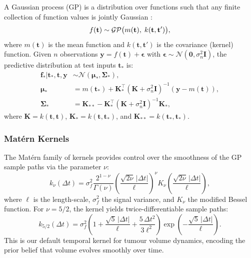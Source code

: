A Gaussian process (GP) is a distribution over functions such that any finite
collection of function values is jointly Gaussian
\cite{rasmussen2006gaussian}:
\begin{equation}
  f(\mathbf{t}) \sim \mathcal{GP}\bigl(m(\mathbf{t}),\; k(\mathbf{t}, \mathbf{t}')\bigr),
  \label{eq:gp_def}
\end{equation}
where $m(\mathbf{t})$ is the mean function and $k(\mathbf{t}, \mathbf{t}')$
is the covariance (kernel) function. Given $n$ observations
$\mathbf{y} = f(\mathbf{t}) + \boldsymbol{\epsilon}$ with
$\boldsymbol{\epsilon} \sim \mathcal{N}(\mathbf{0}, \sigma_n^2 \mathbf{I})$,
the predictive distribution at test inputs $\mathbf{t}_*$ is:
\begin{align}
  \mathbf{f}_* | \mathbf{t}_*, \mathbf{t}, \mathbf{y}
    &\sim \mathcal{N}(\boldsymbol{\mu}_*, \boldsymbol{\Sigma}_*), \\
  \boldsymbol{\mu}_* &= m(\mathbf{t}_*) + \mathbf{K}_*^\top
    (\mathbf{K} + \sigma_n^2\mathbf{I})^{-1}(\mathbf{y} - m(\mathbf{t})),
    \label{eq:gp_mean} \\
  \boldsymbol{\Sigma}_* &= \mathbf{K}_{**} - \mathbf{K}_*^\top
    (\mathbf{K} + \sigma_n^2\mathbf{I})^{-1}\mathbf{K}_*,
    \label{eq:gp_var}
\end{align}
where $\mathbf{K} = k(\mathbf{t}, \mathbf{t})$,
$\mathbf{K}_* = k(\mathbf{t}, \mathbf{t}_*)$, and
$\mathbf{K}_{**} = k(\mathbf{t}_*, \mathbf{t}_*)$.

\subsubsection{Mat\'{e}rn Kernels}

The Mat\'{e}rn family of kernels provides control over the smoothness of
the GP sample paths via the parameter $\nu$:
\begin{equation}
  k_{\nu}(\Delta t) = \sigma_f^2 \frac{2^{1-\nu}}{\Gamma(\nu)}
    \left(\frac{\sqrt{2\nu}\,|\Delta t|}{\ell}\right)^\nu
    K_\nu\!\left(\frac{\sqrt{2\nu}\,|\Delta t|}{\ell}\right),
  \label{eq:matern}
\end{equation}
where $\ell$ is the length-scale, $\sigma_f^2$ the signal variance, and
$K_\nu$ the modified Bessel function. For $\nu = 5/2$, the kernel yields
twice-differentiable sample paths:
\begin{equation}
  k_{5/2}(\Delta t) = \sigma_f^2
    \left(1 + \frac{\sqrt{5}\,|\Delta t|}{\ell}
    + \frac{5\,\Delta t^2}{3\ell^2}\right)
    \exp\!\left(-\frac{\sqrt{5}\,|\Delta t|}{\ell}\right).
  \label{eq:matern52}
\end{equation}
This is our default temporal kernel for tumour volume dynamics, encoding the
prior belief that volume evolves smoothly over time.

